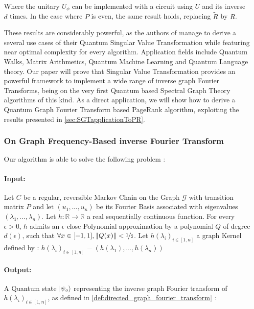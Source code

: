 \documentclass{article}
\begin{document}
Where the unitary $U_\phi$ can be implemented with a circuit using $U$ and its inverse $d$ times. In the case where $P$ is even, the same result holds, replacing $\widetilde{R}$ by $R$.

These results are considerably powerful, as the authors of \cite{gilyén_su_low_wiebe_2019} manage to derive a several use cases of their Quantum Singular Value Transformation while featuring near optimal complexity for every algorithm. Application fields include Quantum Walks, Matrix Arithmetics, Quantum Machine Learning and Quantum Language theory. Our paper will prove that Singular Value Transformation provides an powerful framework to implement a wide range of inverse graph Fourier Transforms, being on the very first Quantum based Spectral Graph Theory algorithms of this kind. As a direct application, we will show how to derive a Quantum Graph Fourier Transform based PageRank algorithm, exploiting the results presented in \ref{sec:SGTapplicationToPR}.

\subsubsection{On Graph Frequency-Based inverse Fourier Transform}

Our algorithm is able to solve the following problem :

\paragraph{Input:}\label{par:algo_1_inputs} Let $C$ be a regular, reversible Markov Chain on the Graph $\mathcal{G}$ with transition matrix $P$ and let $(u_1, \hdots, u_n)$ be its Fourier Basis associated with eigenvalues $(\lambda_1, \hdots, \lambda_n)$. Let $h: \mathbb{R} \rightarrow \mathbb{R} $ a real sequentially continuous function. For every $\epsilon > 0$, $h$ admits an $\epsilon$-close Polynomial approximation by a polynomial $Q$ of degree $d(\epsilon)$, such that $\forall x \in [-1,1], \|Q(x)\|< \nicefrac{1}{2}$. Let $h(\lambda_i)_{i\in [1, n]}$ a graph Kernel defined by : $h(\lambda_i)_{i\in [1, n]}=(h(\lambda_1), \hdots, h(\lambda_n))$

\paragraph{Output:} A Quantum state $\ket{\psi_o}$ representing the inverse graph Fourier transform of $h(\lambda_i)_{i\in [1, n]}$, as defined in \ref{def:directed_graph_fourier_transform} :
\end{document}
